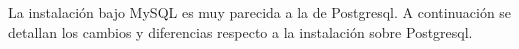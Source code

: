 La instalación bajo MySQL es muy parecida a la de Postgresql. A continuación se detallan los cambios y diferencias respecto a la instalación sobre Postgresql.